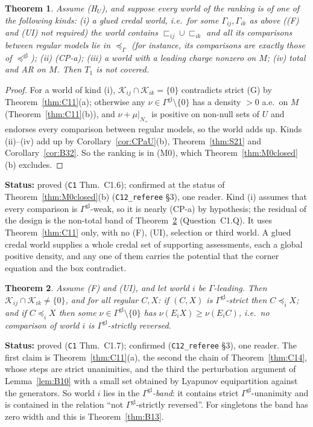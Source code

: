 \documentclass[11pt]{article}
\newtheorem{theorem}{Theorem}[section]
\theoremstyle{definition}
\theoremstyle{remark}
\newcommand{\src}[1]{\texttt{#1}}
\newcommand{\status}[1]{\par\smallskip\noindent\textbf{Status:} #1\par\smallskip}
\begin{document}
\begin{theorem}\label{thm:C16}
Assume (H$_U$), and suppose every world of the ranking is of one of the following kinds: (i) a \emph{glued credal world}, i.e.\ for some $\Gamma_{ij},\Gamma_{ik}$ as above ((F) and (UI) not required) the world contains $\sqsubset_{ij}\cup\sqsubset_{ik}$ and all its comparisons between regular models lie in $\preceq_\Gamma$ (for instance, its comparisons are exactly those of $\preceq^{\mathrm{gl}}$); (ii) (CP-a); (iii) a world with a leading charge nonzero on $M$; (iv) total and AR on $M$. Then $T_1$ is not covered.
\end{theorem}
\begin{proof}
For a world of kind (i), $\mathcal K_{ij}\cap\mathcal K_{ik}=\{0\}$ contradicts strict (G) by Theorem~\ref{thm:C11}(a); otherwise any $\nu\in\Gamma^{\mathrm{gl}}\setminus\{0\}$ has a density $>0$ a.e.\ on $M$ (Theorem~\ref{thm:C11}(b)), and $\nu+\mu|_{N_+}$ is positive on non-null sets of $U$ and endorses every comparison between regular models, so the world adds up. Kinds (ii)--(iv) add up by Corollary~\ref{cor:CPaU}(b), Theorem~\ref{thm:S21} and Corollary~\ref{cor:B32}. So the ranking is in (M0), which Theorem~\ref{thm:M0closed}(b) excludes.
\end{proof}
\status{proved (\src{C1} Thm.~C1.6); confirmed at the status of Theorem~\ref{thm:M0closed}(b) (\src{C12\_referee} \S3), one reader. Kind (i) assumes that every comparison is $\Gamma^{\mathrm{gl}}$-weak, so it is nearly (CP-a) by hypothesis; the residual of the design is the non-total band of Theorem~\ref{thm:C17} (Question~C1.Q). It uses Theorem~\ref{thm:C11} only, with no (F), (UI), selection or third world. A glued credal world supplies a whole credal set of supporting assessments, each a global positive density, and any one of them carries the potential that the corner equation and the box contradict.}

\begin{theorem}\label{thm:C17}
Assume (F) and (UI), and let world $i$ be $\Gamma$-leading. Then $\mathcal K_{ij}\cap\mathcal K_{ik}\ne\{0\}$, and for all regular $C,X$: if $(C,X)$ is $\Gamma^{\mathrm{gl}}$-strict then $C\preceq_iX$; and if $C\preceq_iX$ then some $\nu\in\Gamma^{\mathrm{gl}}\setminus\{0\}$ has $\nu(E_iX)\ge\nu(E_iC)$, i.e.\ no comparison of world $i$ is $\Gamma^{\mathrm{gl}}$-strictly reversed.
\end{theorem}
\status{proved (\src{C1} Thm.~C1.7); confirmed (\src{C12\_referee} \S3), one reader. The first claim is Theorem~\ref{thm:C11}(a), the second the chain of Theorem~\ref{thm:C14}, whose steps are strict unanimities, and the third the perturbation argument of Lemma~\ref{lem:B10} with a small set obtained by Lyapunov equipartition against the generators. So world $i$ lies in the \emph{$\Gamma^{\mathrm{gl}}$-band}: it contains strict $\Gamma^{\mathrm{gl}}$-unanimity and is contained in the relation ``not $\Gamma^{\mathrm{gl}}$-strictly reversed''. For singletons the band has zero width and this is Theorem~\ref{thm:B13}.}
\end{document}
